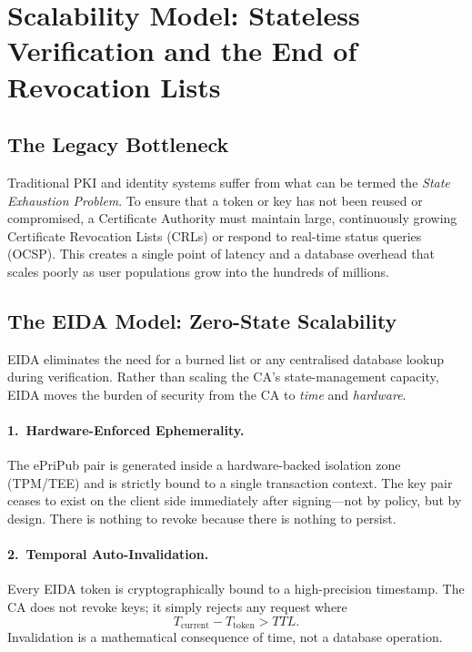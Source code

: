\documentclass[11pt,a4paper]{article}
\begin{document}
\section{Scalability Model: Stateless Verification and the End of Revocation
  Lists}
\label{sec:scalability}

\subsection{The Legacy Bottleneck}

Traditional PKI and identity systems suffer from what can be termed the
\emph{State Exhaustion Problem}.  To ensure that a token or key has not been
reused or compromised, a Certificate Authority must maintain large,
continuously growing Certificate Revocation Lists (CRLs) or respond to
real-time status queries (OCSP\@).  This creates a single point of latency
and a database overhead that scales poorly as user populations grow into the
hundreds of millions.

\subsection{The EIDA Model: Zero-State Scalability}

EIDA eliminates the need for a burned list or any centralised database lookup
during verification.  Rather than scaling the CA's state-management capacity,
EIDA moves the burden of security from the CA to \emph{time} and
\emph{hardware}.

\paragraph{1.~Hardware-Enforced Ephemerality.}
The ePriPub pair is generated inside a hardware-backed isolation zone
(TPM/TEE) and is strictly bound to a single transaction context.  The key
pair ceases to exist on the client side immediately after signing---not by
policy, but by design.  There is nothing to revoke because there is nothing to
persist.

\paragraph{2.~Temporal Auto-Invalidation.}
Every EIDA token is cryptographically bound to a high-precision timestamp.
The CA does not revoke keys; it simply rejects any request where
\[
  T_{\text{current}} - T_{\text{token}} > \mathit{TTL}.
\]
Invalidation is a mathematical consequence of time, not a database operation.
\end{document}
